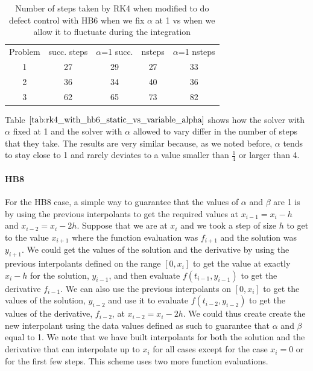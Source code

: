 \begin{table}[h]
\caption {Number of steps taken by RK4 when modified to do defect control with HB6 when we fix $\alpha$ at 1 vs when we allow it to fluctuate during the integration} \label{tab:rk4_with_hb6_static_vs_variable_alpha}
\begin{center}
\begin{tabular}{ c c c c c } 
Problem & succ. steps & $\alpha$=1 succ. & nsteps & $\alpha$=1 nsteps \\ 
1       & 27                      &        29               & 27         & 33\\ 
2       & 36                      &        34               & 40         & 36\\
3       & 62                      &        65               & 73         & 82\\
\end{tabular}
\end{center}
\end{table}

Table $\ref{tab:rk4_with_hb6_static_vs_variable_alpha}$ shows how the solver with $\alpha$ fixed at 1 and the solver with $\alpha$ allowed to vary differ in the number of steps that they take. The results are very similar because, as we noted before, $\alpha$ tends to stay close to 1 and rarely deviates to a value smaller than $\frac{1}{4}$ or larger than 4.

\paragraph{HB8} For the HB8 case, a simple way to guarantee that the values of $\alpha$ and $\beta$ are 1 is by using the previous interpolants to get the required values at $x_{i - 1}=x_i-h$ and $x_{i - 2}=x_i-2h$. Suppose that we are at $x_i$ and we took a step of size $h$ to get to the value $x_{i + 1}$ where the function evaluation was $f_{i + 1}$ and the solution was $y_{i + 1}$. We could get the values of the solution and the derivative by using the previous interpolants defined on the range $[0, x_i]$ to get the value at exactly $x_i - h$ for the solution, $y_{i - 1}$, and then evaluate $f(t_{i-1}, y_{i-1})$ to get the derivative $f_{i - 1}$.  We can also use the previous interpolants on $[0, x_i]$ to get the values of the solution, $y_{i-2}$ and use it to evaluate $f(t_{i-2}, y_{i-2})$ to get the values of the derivative, $f_{i-2}$, at $x_{i-2} = x_i - 2h$. We could thus create create the new interpolant using the data values defined as such to guarantee that $\alpha$ and $\beta$ equal to 1. We note that we have built interpolants for both the solution and the derivative that  can interpolate up to $x_i$ for all cases except for the case $x_i = 0$ or for the first few steps. This scheme uses two more function evaluations.

